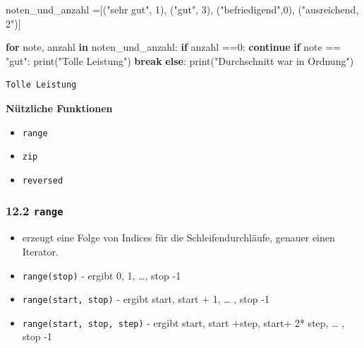\documentclass[
  11pt,
  a4paper,
  DIV=11,
  numbers=noendperiod]{scrartcl}
\newenvironment{Shaded}{\begin{snugshade}}{\end{snugshade}}
\newcommand{\BuiltInTok}[1]{\textcolor[rgb]{0.00,0.23,0.31}{#1}}
\newcommand{\ControlFlowTok}[1]{\textcolor[rgb]{0.00,0.23,0.31}{\textbf{#1}}}
\newcommand{\DecValTok}[1]{\textcolor[rgb]{0.68,0.00,0.00}{#1}}
\newcommand{\KeywordTok}[1]{\textcolor[rgb]{0.00,0.23,0.31}{\textbf{#1}}}
\newcommand{\NormalTok}[1]{\textcolor[rgb]{0.00,0.23,0.31}{#1}}
\newcommand{\OperatorTok}[1]{\textcolor[rgb]{0.37,0.37,0.37}{#1}}
\newcommand{\StringTok}[1]{\textcolor[rgb]{0.13,0.47,0.30}{#1}}
\providecommand{\tightlist}{%
  \setlength{\itemsep}{0pt}\setlength{\parskip}{0pt}}
\begin{document}
\begin{Shaded}
\begin{Highlighting}[numbers=left,,]
\NormalTok{noten\_und\_anzahl }\OperatorTok{=}\NormalTok{[(}\StringTok{"sehr gut"}\NormalTok{, }\DecValTok{1}\NormalTok{), (}\StringTok{"gut"}\NormalTok{, }\DecValTok{3}\NormalTok{), (}\StringTok{"befriedigend"}\NormalTok{,}\DecValTok{0}\NormalTok{), (}\StringTok{"ausreichend, 2"}\NormalTok{)]}

\ControlFlowTok{for}\NormalTok{ note, anzahl }\KeywordTok{in}\NormalTok{ noten\_und\_anzahl:}
    \ControlFlowTok{if}\NormalTok{ anzahl }\OperatorTok{==}\DecValTok{0}\NormalTok{:}
        \ControlFlowTok{continue}
    \ControlFlowTok{if}\NormalTok{ note }\OperatorTok{==} \StringTok{"gut"}\NormalTok{:}
        \BuiltInTok{print}\NormalTok{(}\StringTok{"Tolle Leistung"}\NormalTok{)}
        \ControlFlowTok{break}
\ControlFlowTok{else}\NormalTok{:}
    \BuiltInTok{print}\NormalTok{(}\StringTok{"Durchschnitt war in Ordnung"}\NormalTok{)}
     
\end{Highlighting}
\end{Shaded}

\begin{verbatim}
Tolle Leistung
\end{verbatim}

\textbf{Nützliche Funktionen}

\begin{itemize}
\tightlist
\item
  \texttt{range}
\item
  \texttt{zip}
\item
  \texttt{reversed}
\end{itemize}

\subsubsection{\texorpdfstring{12.2
\texttt{range}}{12.2 range}}\label{range}

\begin{itemize}
\tightlist
\item
  erzeugt eine Folge von Indices für die Schleifendurchläufe, genauer
  einen Iterator.
\item
  \texttt{range(stop)} - ergibt 0, 1, \ldots, stop -1
\item
  \texttt{range(start,\ stop)} - ergibt start, start + 1, \ldots{} ,
  stop -1
\item
  \texttt{range(start,\ stop,\ step)} - ergibt start, start +step,
  start+ 2* step, \ldots{} , stop -1
\end{itemize}
\end{document}
